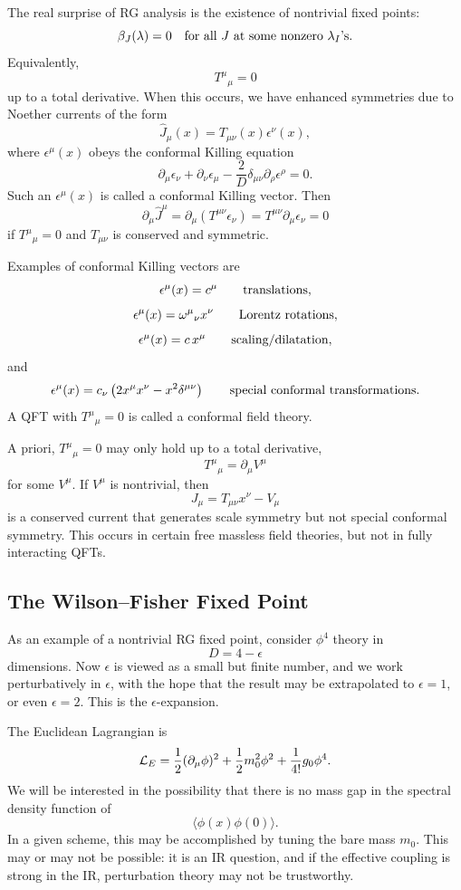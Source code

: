 The real surprise of RG analysis is the existence of nontrivial fixed
points:
\[
  \beta_J(\lambda)=0
  \quad\hbox{for all \(J\) at some nonzero \(\lambda_I\)'s}.
\]
Equivalently,
\[
  T^\mu{}_\mu=0
\]
up to a total derivative.  When this occurs, we have enhanced symmetries due
to Noether currents of the form
\[
  \widehat J_\mu(x)=T_{\mu\nu}(x)\epsilon^\nu(x),
\]
where \(\epsilon^\mu(x)\) obeys the conformal Killing equation
\[
  \partial_\mu\epsilon_\nu+\partial_\nu\epsilon_\mu
  -\frac{2}{D}\delta_{\mu\nu}
  \partial_\rho\epsilon^\rho
  =
  0.
\]
Such an \(\epsilon^\mu(x)\) is called a conformal Killing vector.  Then
\[
  \partial_\mu\widehat J^\mu
  =
  \partial_\mu\!\left(T^{\mu\nu}\epsilon_\nu\right)
  =
  T^{\mu\nu}\partial_\mu\epsilon_\nu
  =
  0
\]
if \(T^\mu{}_\mu=0\) and \(T_{\mu\nu}\) is conserved and symmetric.

Examples of conformal Killing vectors are
\[
  \epsilon^\mu(x)=c^\mu
  \qquad\hbox{translations},
\]
\[
  \epsilon^\mu(x)=\omega^\mu{}_\nu x^\nu
  \qquad\hbox{Lorentz rotations},
\]
\[
  \epsilon^\mu(x)=c\,x^\mu
  \qquad\hbox{scaling/dilatation},
\]
and
\[
  \epsilon^\mu(x)
  =
  c_\nu\left(2x^\mu x^\nu-x^2\delta^{\mu\nu}\right)
  \qquad\hbox{special conformal transformations}.
\]
A QFT with \(T^\mu{}_\mu=0\) is called a conformal field theory.

A priori, \(T^\mu{}_\mu=0\) may only hold up to a total derivative,
\[
  T^\mu{}_\mu=\partial_\mu V^\mu
\]
for some \(V^\mu\).  If \(V^\mu\) is nontrivial, then
\[
  J_\mu=T_{\mu\nu}x^\nu-V_\mu
\]
is a conserved current that generates scale symmetry but not special
conformal symmetry.  This occurs in certain free massless field theories, but
not in fully interacting QFTs.

\subsection{The Wilson--Fisher Fixed Point}

As an example of a nontrivial RG fixed point, consider \(\phi^4\) theory in
\[
  D=4-\epsilon
\]
dimensions.  Now \(\epsilon\) is viewed as a small but finite number, and we
work perturbatively in \(\epsilon\), with the hope that the result may be
extrapolated to \(\epsilon=1\), or even \(\epsilon=2\).  This is the
\(\epsilon\)-expansion.

The Euclidean Lagrangian is
\[
  {\cal L}_E
  =
  \frac12(\partial_\mu\phi)^2
  +
  \frac12 m_0^2\phi^2
  +
  \frac{1}{4!}g_0\phi^4.
\]
We will be interested in the possibility that there is no mass gap in the
spectral density function of
\[
  \langle\phi(x)\phi(0)\rangle.
\]
In a given scheme, this may be accomplished by tuning the bare mass \(m_0\).
This may or may not be possible: it is an IR question, and if the effective
coupling is strong in the IR, perturbation theory may not be trustworthy.

